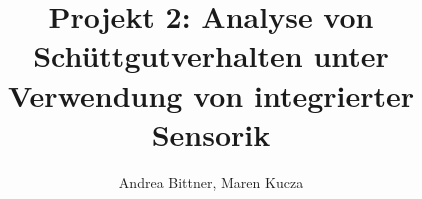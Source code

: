 \documentclass[cover]{isas-seminar}
\title{Projekt 2: Analyse von Schüttgutverhalten unter Verwendung von integrierter Sensorik}
\author{Andrea Bittner, Maren Kucza}
\begin{document}
\maketitle

\begin{abstract}
\end{abstract}
\clearpage
\tableofcontents
\cleardoublepage








\end{document}
